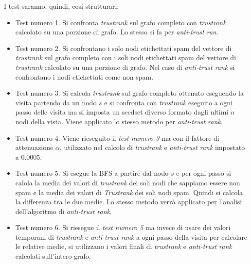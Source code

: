 I test saranno, quindi, cosi strutturari:
\begin{itemize}
 \item Test numero 1. Si confronta \textit{trustrank} sul grafo completo con \textit{trustrank} calcolato su una porzione di grafo. Lo stesso si fa per \textit{anti-trust ran}.
 \item Test numero 2. Si confrontano i solo nodi etichettati spam del vettore di  \textit{trustrank} sul grafo completo con  i soli nodi etichettati spam del vettore di \textit{trustrank} calcolato su una porzione di grafo. Nel caso di \textit{anti-trust rank} si  confrontano i nodi etichettati come non spam.
 \item Test numero 3. Si calcola \textit{trustrank} sul grafo completo ottenuto eseguendo la visita partendo da un nodo \(s\) e si confronta con \textit{trustrank} eseguito a ogni passo delle visita ma si imposta un seedset diverso formato dagli ultimi \(n\) nodi della vista. Viene applicato lo stesso metodo per \textit{anti-trust rank}.
 \item Test numero 4. Viene rieseguito il \textit{test numero 3} ma con il fattore di attenuazione \(\alpha\), utilizzato nel calcolo di \textit{trustrank} e \textit{anti-trust rank} impostato a 0.0005.
 \item Test numero 5. Si esegue la BFS a partire dal nodo \(s\) e per ogni passo si calola la media dei valori di \textit{trustrank} dei soli nodi che sappiamo essere non spam e la media dei valori di \textit{Trustrank} dei soli nodi spam. Quindi si calcola la differenza tra le due medie. Lo stesso metodo verrà applicato per l'analisi dell'algoritmo di \textit{anti-trust rank}.
  \item Test numero 6. Si riesegue il \textit{test numero 5} ma invece di usare dei valori temporani di \textit{trustrank} e \textit{anti-trust rank} a ogni passo della visita per calcolare le relative medie, si utilizzano i valori finali di \textit{trustrank} e \textit{anti-trust rank} calcolati sull'intero grafo.
 \end{itemize}
 
